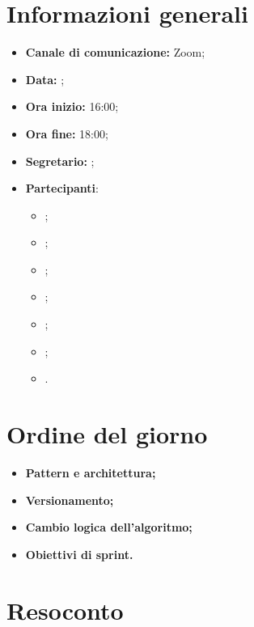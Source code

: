 \section{Informazioni generali}

\begin{itemize}

    \item \textbf{Canale di comunicazione:} Zoom;

    \item \textbf{Data:} \DataMeeting{};

    \item \textbf{Ora inizio:} 16:00;

    \item \textbf{Ora fine:} 18:00;

    \item \textbf{Segretario:} \ACapoRedazione{};

    \item \textbf{Partecipanti}: 
        \begin{itemize}
            \item \Daniele{};
            \item \Davide{};
            \item \Francesco{};
            \item \Giosue{};
            \item \Lucrezia{};
            \item \Matteo{};
            \item \Tommaso{}.
        \end{itemize}
\end{itemize}

\section{Ordine del giorno}

\begin{itemize}
    \item\textbf{Pattern e architettura;}
    \item\textbf{Versionamento;}
    \item\textbf{Cambio logica dell'algoritmo;}
    \item\textbf{Obiettivi di sprint.}
\end{itemize}
\newpage


\section{Resoconto}
